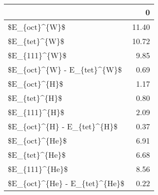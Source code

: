 \begin{tabular}{lr}
\toprule
{} &     0 \\
\midrule
\$E\_\{oct\}\textasciicircum \{W\}\$                 & 11.40 \\
\$E\_\{tet\}\textasciicircum \{W\}\$                 & 10.72 \\
\$E\_\{111\}\textasciicircum \{W\}\$                 &  9.85 \\
\$E\_\{oct\}\textasciicircum \{W\} - E\_\{tet\}\textasciicircum \{W\}\$   &  0.69 \\
\$E\_\{oct\}\textasciicircum \{H\}\$                 &  1.17 \\
\$E\_\{tet\}\textasciicircum \{H\}\$                 &  0.80 \\
\$E\_\{111\}\textasciicircum \{H\}\$                 &  2.09 \\
\$E\_\{oct\}\textasciicircum \{H\} - E\_\{tet\}\textasciicircum \{H\}\$   &  0.37 \\
\$E\_\{oct\}\textasciicircum \{He\}\$                &  6.91 \\
\$E\_\{tet\}\textasciicircum \{He\}\$                &  6.68 \\
\$E\_\{111\}\textasciicircum \{He\}\$                &  8.56 \\
\$E\_\{oct\}\textasciicircum \{He\} - E\_\{tet\}\textasciicircum \{He\}\$ &  0.22 \\
\bottomrule
\end{tabular}
